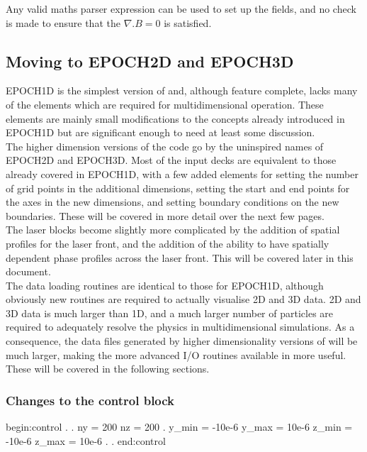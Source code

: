 \documentclass[12pt,a4paper]{article}
\newcommand{\inlineemph}[1]{{\color{warwicklight} \bf{#1}}}
\newcommand{\EPOCH}{{\color{warwickdark}\fontfamily{phv}\selectfont{EPOCH}}}
\newenvironment{lboxverbatim}[1]{
\setlength{\FrameSep}{0pt}
\def\FrameCommand{\fboxsep=0pt \colorbox{shadecolor}}
\MakeFramed{\FrameRestore}
\vspace{-13.5pt}
\fvset{label=#1}
\boxverb
}{
\endboxverb
\vspace{-13.5pt}
\endMakeFramed
}
\begin{document}
Any valid maths parser expression can be used to set up the fields, and no
check is made to ensure that the $\nabla.B = 0$ is satisfied. \\

\subsection{Moving to EPOCH2D and EPOCH3D}
EPOCH1D is the simplest version of {\EPOCH} and, although feature complete,
lacks many of the elements which are required for multidimensional operation.
These elements are mainly small modifications to the concepts already
introduced in EPOCH1D but are significant enough to need at least some
discussion.\\

The higher dimension versions of the code go by the uninspired names of EPOCH2D
and EPOCH3D. Most of the input decks are equivalent to those already covered in
EPOCH1D, with a few added elements for setting the number of grid points in the
additional dimensions, setting the start and end points for the axes in the new
dimensions, and setting boundary conditions on the new boundaries. These will
be covered in more detail over the next few pages.\\

The laser blocks become slightly more complicated by the addition of spatial
profiles for the laser front, and the addition of the ability to have spatially
dependent phase profiles across the laser front. This will be covered later in
this document.\\

The data loading routines are identical to those for EPOCH1D, although
obviously new routines are required to actually visualise 2D and 3D data. 2D
and 3D data is much larger than 1D, and a much larger number of particles are
required to adequately resolve the physics in multidimensional simulations. As
a consequence, the data files generated by higher dimensionality versions of
{\EPOCH} will be much larger, making the more advanced I/O routines available
in {\EPOCH} more useful. These will be covered in the following sections.\\

\subsubsection{Changes to the \inlineemph{control} block}

\begin{lboxverbatim}{Changed control block}
begin:control
   .
   .
   ny = 200
   nz = 200
   .
   y_min = -10e-6
   y_max = 10e-6
   z_min = -10e-6
   z_max = 10e-6
   .
   .
end:control
\end{lboxverbatim}
\end{document}
